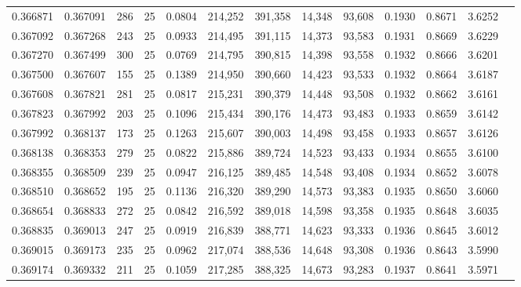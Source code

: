 \begin{tabular}{rrrrrrrrrrrrr}
0.366871 & 0.367091 &   286 &  25 &                                     0.0804 & 214,252 & 391,358 &  14,348 &  93,608 & 0.1930 & 0.8671 & 3.6252 \\
0.367092 & 0.367268 &   243 &  25 &                                     0.0933 & 214,495 & 391,115 &  14,373 &  93,583 & 0.1931 & 0.8669 & 3.6229 \\
0.367270 & 0.367499 &   300 &  25 &                                     0.0769 & 214,795 & 390,815 &  14,398 &  93,558 & 0.1932 & 0.8666 & 3.6201 \\
0.367500 & 0.367607 &   155 &  25 &                                     0.1389 & 214,950 & 390,660 &  14,423 &  93,533 & 0.1932 & 0.8664 & 3.6187 \\
0.367608 & 0.367821 &   281 &  25 &                                     0.0817 & 215,231 & 390,379 &  14,448 &  93,508 & 0.1932 & 0.8662 & 3.6161 \\
0.367823 & 0.367992 &   203 &  25 &                                     0.1096 & 215,434 & 390,176 &  14,473 &  93,483 & 0.1933 & 0.8659 & 3.6142 \\
0.367992 & 0.368137 &   173 &  25 &                                     0.1263 & 215,607 & 390,003 &  14,498 &  93,458 & 0.1933 & 0.8657 & 3.6126 \\
0.368138 & 0.368353 &   279 &  25 &                                     0.0822 & 215,886 & 389,724 &  14,523 &  93,433 & 0.1934 & 0.8655 & 3.6100 \\
0.368355 & 0.368509 &   239 &  25 &                                     0.0947 & 216,125 & 389,485 &  14,548 &  93,408 & 0.1934 & 0.8652 & 3.6078 \\
0.368510 & 0.368652 &   195 &  25 &                                     0.1136 & 216,320 & 389,290 &  14,573 &  93,383 & 0.1935 & 0.8650 & 3.6060 \\
0.368654 & 0.368833 &   272 &  25 &                                     0.0842 & 216,592 & 389,018 &  14,598 &  93,358 & 0.1935 & 0.8648 & 3.6035 \\
0.368835 & 0.369013 &   247 &  25 &                                     0.0919 & 216,839 & 388,771 &  14,623 &  93,333 & 0.1936 & 0.8645 & 3.6012 \\
0.369015 & 0.369173 &   235 &  25 &                                     0.0962 & 217,074 & 388,536 &  14,648 &  93,308 & 0.1936 & 0.8643 & 3.5990 \\
0.369174 & 0.369332 &   211 &  25 &                                     0.1059 & 217,285 & 388,325 &  14,673 &  93,283 & 0.1937 & 0.8641 & 3.5971 \\

\end{tabular}
